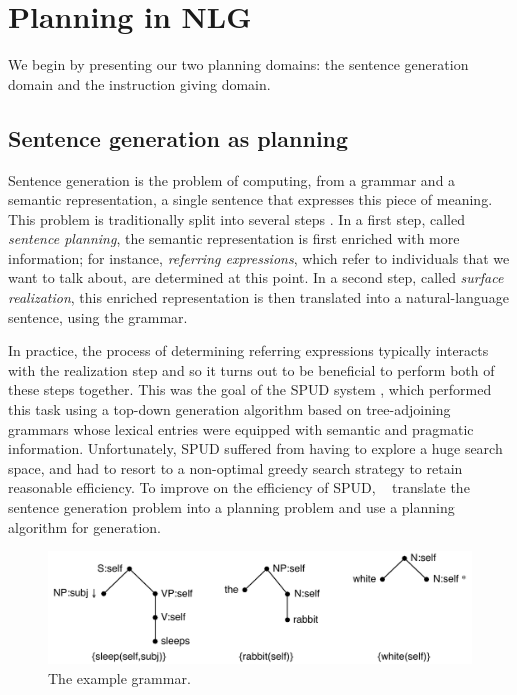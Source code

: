 \section{Planning in NLG} \label{sec:domains}

We begin by presenting our two planning domains: the sentence generation
domain and the instruction giving domain.


\subsection{Sentence generation as planning}

Sentence generation is the problem of computing, from a grammar and a
semantic representation, a single sentence that expresses this piece of
meaning.  This problem is traditionally split into several steps
\cite{reiter00building}.  In a first step, called \emph{sentence planning},
the semantic representation is first enriched with more information; for
instance, \emph{referring expressions}, which refer to individuals
that we want to talk about, are determined at this point. In a second
step, called \emph{surface realization}, this enriched representation is
then translated into a natural-language sentence, using the grammar.

In practice, the process of determining referring expressions typically
interacts with the realization step and so it turns out to be beneficial to
perform both of these steps together. This was the goal of the SPUD system
\cite{Stone2003a}, which performed this task using a top-down generation
algorithm based on tree-adjoining grammars \cite{joshi;etal1997} whose
lexical entries were equipped with semantic and pragmatic information.
Unfortunately, SPUD suffered from having to explore a huge search space,
and had to resort to a non-optimal greedy search strategy to retain
reasonable efficiency.  To improve on the efficiency of SPUD,
\citeauthor{KolSto07}~ translate the sentence
generation problem into a planning problem and use a planning algorithm for
generation.

\begin{figure}
  \centering
  \includegraphics[width=\columnwidth]{pic-grammar}
  \caption{The example grammar.}
  \label{fig:white-rabbit-sleeps-grammar}
\end{figure}

